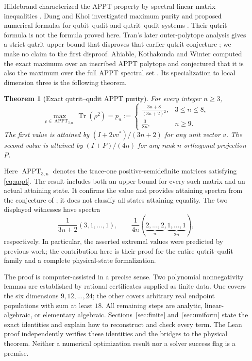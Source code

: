 \documentclass[11pt]{article}
\newtheorem{theorem}{Theorem}[section]
\theoremstyle{remark}\newtheorem{remark}[theorem]{Remark}
\newcommand{\Tr}{\operatorname{Tr}}
\newcommand{\APPT}{\operatorname{APPT}}
\begin{document}
Hildebrand characterized the APPT property by spectral linear matrix inequalities \cite{Hildebrand}. Dung and Khoi investigated maximum purity and proposed numerical formulas for qubit--qudit and qutrit--qudit systems \cite{DungKhoi}. Their qutrit formula is not the formula proved here. Tran's later outer-polytope analysis gives a strict qutrit upper bound that disproves that earlier qutrit conjecture \cite{Tran}; we make no claim to the first disproof. Ahiable, Kothakonda and Winter computed the exact maximum over an inscribed APPT polytope and conjectured that it is also the maximum over the full APPT spectral set \cite[Theorem 6.3, Corollary 6.4 and Conjecture 6.7]{AKW}. Its specialization to local dimension three is the following theorem.

\begin{theorem}[Exact qutrit--qudit APPT purity]\label{thm:main}
For every integer $n\geq3$,
\begin{equation}\label{eq:maximum}
 \max_{\rho\in\APPT_{3,n}}\Tr(\rho^2)
 =p_n:={\begin{cases}
 \displaystyle\frac{3n+8}{(3n+2)^2},&3\leq n\leq8,\\[6pt]
 \displaystyle\frac{3}{8n},&n\geq9.
 \end{cases}}
\end{equation}
The first value is attained by $(I+2vv^*)/(3n+2)$ for any unit vector $v$. The second value is attained by $(I+P)/(4n)$ for any rank-$n$ orthogonal projection $P$.
\end{theorem}

Here $\APPT_{3,n}$ denotes the trace-one positive-semidefinite matrices satisfying \eqref{eq:appt}. The result includes both an upper bound for every such matrix and an actual attaining state. It confirms the value and provides attaining spectra from the conjecture of \cite{AKW}; it does not classify all states attaining equality. The two displayed witnesses have spectra
\begin{equation}\label{eq:witness-spectra}
 \frac{1}{3n+2}(3,1,\ldots,1),\qquad
 \frac{1}{4n}(\underbrace{2,\ldots,2}_{n},
                  \underbrace{1,\ldots,1}_{2n}),
\end{equation}
respectively. In particular, the asserted extremal values were predicted by previous work; the contribution here is their proof for the entire qutrit--qudit family and a complete physical-state formalization.

The proof is computer-assisted in a precise sense. Two polynomial nonnegativity lemmas are established by rational certificates supplied as finite data. One covers the six dimensions $9,12,\ldots,24$; the other covers arbitrary real endpoint populations with sum at least $18$. All remaining steps are analytic, linear-algebraic, or elementary algebraic. Sections~\ref{sec:finite} and~\ref{sec:uniform} state the exact identities and explain how to reconstruct and check every term. The Lean proof independently verifies these identities and the bridges to the physical theorem. Neither a numerical optimization result nor a solver success flag is a premise.
\end{document}

